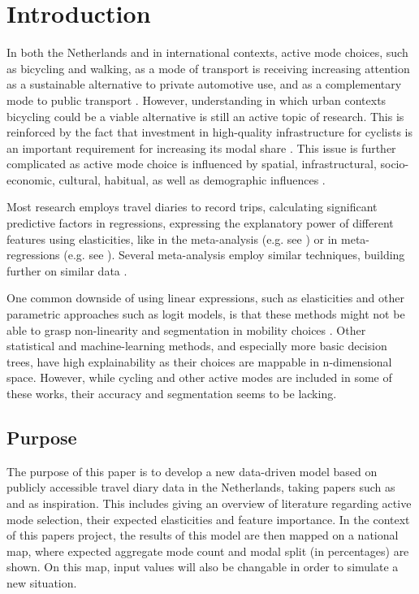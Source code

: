 \documentclass[sigconf, natbib=false, nonacm]{acmart}
\begin{document}
\section{Introduction}  
    In both the Netherlands and in international contexts, active mode choices, such as bicycling and walking, as a mode of transport is receiving increasing attention as a sustainable alternative to private automotive use, and as a complementary mode to public transport \parencite{naess_what_2012, pucher_making_2008, romanillos_cyclists_2020, dekoster_cycling_1999}. However, understanding in which urban contexts bicycling could be a viable alternative is still an active topic of research. This is reinforced by the fact that investment in high-quality infrastructure for cyclists is an important requirement for increasing its modal share \parencite{goodwin_why_2012, pucher_making_2008, buehler_bikeway_2016}. This issue is further complicated as active mode choice is influenced by spatial, infrastructural, socio-economic, cultural, habitual, as well as demographic influences \parencite{naess_built_2015, felix_maturing_2019, oldenziel_contested_2011, ton_unravelling_2019}. 
    
    Most research employs travel diaries to record trips, calculating significant predictive factors in regressions, expressing the explanatory power of different features using elasticities, like in the meta-analysis (e.g. see \cite{ewing_travel_2010}) or in meta-regressions (e.g. see \cite{stevens_does_2017}). Several meta-analysis employ similar techniques, building further on similar data \parencite{naess_meta-analyses_2022}. 
    
    One common downside of using linear expressions, such as elasticities and other parametric approaches such as logit models, is that these methods might not be able to grasp non-linearity and segmentation in mobility choices \cite{lee_comparison_2018}. Other statistical and machine-learning methods, and especially more basic decision trees, have high explainability as their choices are mappable in n-dimensional space. However, while cycling and other active modes are included in some of these works, their accuracy and segmentation seems to be lacking. 

    \subsection{Purpose}
    The purpose of this paper is to develop a new data-driven model based on publicly accessible travel diary data in the Netherlands, taking papers such as \cite{ding_applying_2018} and \cite{bakri_inzichten_2023} as inspiration. This includes giving an overview of literature regarding active mode selection, their expected elasticities and feature importance. In the context of this papers project, the results of this model are then mapped on a national map, where expected aggregate mode count and modal split (in percentages) are shown. On this map, input values will also be changable in order to simulate a new situation. 
    
\end{document}
